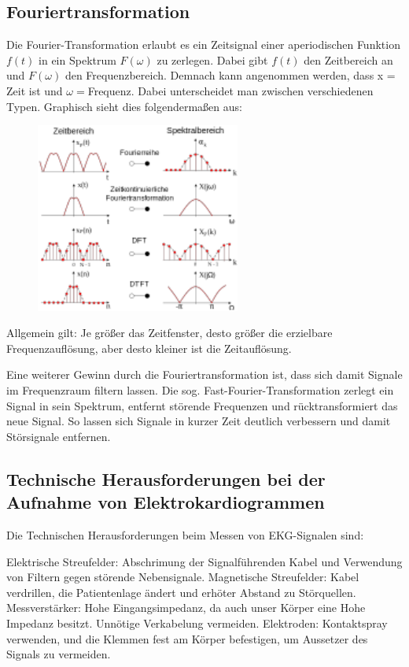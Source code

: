\subsection{Fouriertransformation }
Die Fourier-Transformation erlaubt es ein Zeitsignal einer aperiodischen Funktion $f(t)$ in ein Spektrum $F(\omega)$ zu zerlegen. Dabei gibt $f(t)$ den Zeitbereich an und $F(\omega)$ den Frequenzbereich. Demnach kann angenommen werden, dass x = Zeit ist und $\omega= $Frequenz. 
Dabei unterscheidet man zwischen verschiedenen Typen. Graphisch sieht dies folgendermaßen aus:
\begin{figure}[H]
     \centering
     \includegraphics[width=0.6\textwidth]{Abb/fourier.pdf}
\end{figure}
Allgemein gilt: Je größer das Zeitfenster, desto größer die erzielbare Frequenzauflösung, aber desto kleiner ist die Zeitauflösung.

Eine weiterer Gewinn durch die Fouriertransformation ist, dass sich damit Signale im Frequenzraum filtern lassen. Die sog. Fast-Fourier-Transformation zerlegt ein Signal in sein Spektrum, entfernt störende Frequenzen und rücktransformiert das neue Signal. So lassen sich Signale in kurzer Zeit deutlich verbessern und damit Störsignale entfernen.

\subsection{Technische Herausforderungen bei der Aufnahme von Elektrokardiogrammen}
Die Technischen Herausforderungen beim Messen von EKG-Signalen sind:

Elektrische Streufelder:
  Abschrimung der Signalführenden Kabel und Verwendung von Filtern gegen störende Nebensignale.
Magnetische Streufelder:
  Kabel verdrillen, die Patientenlage ändert und erhöter Abstand zu Störquellen.
Messverstärker:
  Hohe Eingangsimpedanz, da auch unser Körper eine Hohe Impedanz besitzt. Unnötige Verkabelung vermeiden.
Elektroden:
  Kontaktspray verwenden, und die Klemmen fest am Körper befestigen, um Aussetzer des Signals zu vermeiden.
